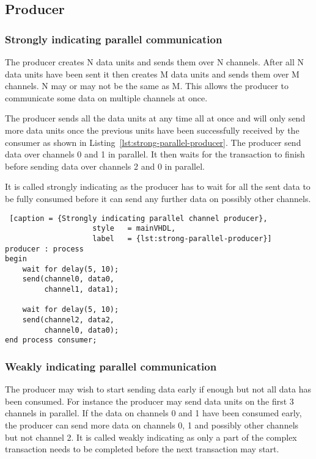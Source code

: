 \documentclass{report}
\begin{document}
\subsection{Producer}

\subsubsection{Strongly indicating parallel communication}

The producer creates N data units and sends them over N channels. After all N
data units have been sent it then creates M data units and sends them over M
channels. N may or may not be the same as M. This allows the producer to
communicate some data on multiple channels at once.

The producer sends all the data units at any time all at once and will only send
more data units once the previous units have been successfully received by the
consumer as shown in Listing~\ref{lst:strong-parallel-producer}. The producer
send data over channels 0 and 1 in parallel. It then waits for the transaction
to finish before sending data over channels 2 and 0 in parallel.

It is called strongly indicating as the producer has to wait for all the sent
data to be fully consumed before it can send any further data on possibly other
channels.

\begin{lstlisting} [caption = {Strongly indicating parallel channel producer},
                    style   = mainVHDL,
                    label   = {lst:strong-parallel-producer}]
producer : process
begin
    wait for delay(5, 10);
    send(channel0, data0,
         channel1, data1);

    wait for delay(5, 10);
    send(channel2, data2,
         channel0, data0);
end process consumer;
\end{lstlisting}

\subsubsection{Weakly indicating parallel communication}

The producer may wish to start sending data early if enough but not all data has
been consumed. For instance the producer may send data units on the first 3
channels in parallel. If the data on channels 0 and 1 have been consumed early,
the producer can send more data on channels 0, 1 and possibly other channels but
not channel 2. It is called weakly indicating as only a part of the complex
transaction needs to be completed before the next transaction may start.
\end{document}
